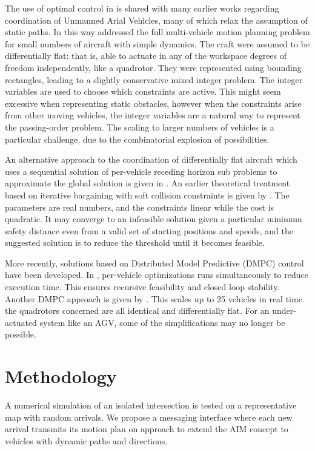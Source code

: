 The use of optimal control in \cite{DeCampos2017} is shared with many earlier works regarding coordination of Unmanned Arial Vehicles, many of which relax the assumption of static paths. In this way \cite{Schouwenaars2004} addressed the full multi-vehicle motion planning problem for small numbers of aircraft with simple dynamics. The craft were assumed to be differentially flat: that is, able to actuate in any of the workspace degrees of freedom independently, like a quadrotor. They were represented using bounding rectangles, leading to a slightly conservative mixed integer problem. The integer variables are used to choose which constraints are active. This might seem excessive when representing static obstacles, however when the constraints arise from other moving vehicles, the integer variables are a natural way to represent the passing-order problem. The scaling to larger numbers of vehicles is a particular challenge, due to the combinatorial explosion of possibilities.

An alternative approach to the coordination of differentially flat aircraft which uses a sequential solution of per-vehicle receding horizon sub problems to approximate the global solution is given in \cite{Keviczky2008}. An earlier theoretical treatment based on iterative bargaining with soft collision constraints is given by \cite{Inalhan2002}. The parameters are real numbers, and the constraints linear while the cost is quadratic. It may converge to an infeasible solution given a particular minimum safety distance even from a valid set of starting positions and speeds, and the suggested solution is to reduce the threshold until it becomes feasible.  

More recently, solutions based on Distributed Model Predictive (DMPC) control have been developed. In \cite{Dai2017}, per-vehicle optimizations runs simultaneously to reduce execution time. This ensures recursive feasibility and closed loop stability. Another DMPC approach is given by \cite{Luis2018}. This scales up to 25 vehicles in real time. the quadrotors concerned are all identical and differentially flat. For an under-actuated system like an AGV, some of the simplifications may no longer be possible.

\section{Methodology} 
A numerical simulation of an isolated intersection is tested on a representative map with random arrivals. We propose a messaging interface where each new arrival transmits its motion plan on approach to extend the AIM concept to vehicles with dynamic paths and directions.

